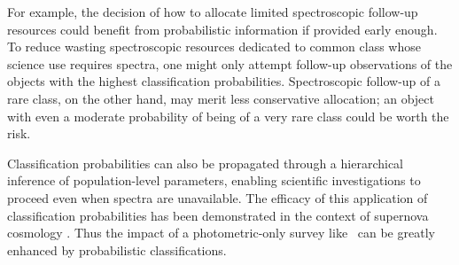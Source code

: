 For example, the decision of how to allocate limited spectroscopic follow-up resources could benefit from probabilistic information if provided early enough.
To reduce wasting spectroscopic resources dedicated to common class whose science use requires spectra, one might only attempt follow-up observations of the objects with the highest classification probabilities.
Spectroscopic follow-up of a rare class, on the other hand, may merit less conservative allocation; an object with even a moderate probability of being of a very rare class could be worth the risk.

Classification probabilities can also be propagated through a hierarchical inference of population-level parameters, enabling scientific investigations to proceed even when spectra are unavailable.
The efficacy of this application of classification probabilities has been demonstrated in the context of supernova cosmology \citep{roberts_zbeams:_2017}.
Thus the impact of a photometric-only survey like \lsst\ can be greatly enhanced by probabilistic classifications.

